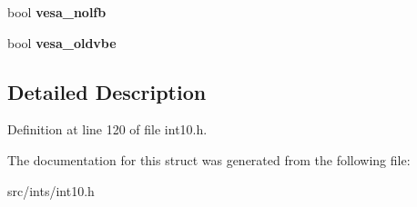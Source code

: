 \begin{DoxyCompactItemize}
\item 
\hypertarget{structInt10Data_a25015b165dce6ad2ac4ec7ba6507f3f2}{bool {\bfseries vesa\-\_\-nolfb}}\label{structInt10Data_a25015b165dce6ad2ac4ec7ba6507f3f2}

\item 
\hypertarget{structInt10Data_a42477f5021cd4868b95435077f26e641}{bool {\bfseries vesa\-\_\-oldvbe}}\label{structInt10Data_a42477f5021cd4868b95435077f26e641}

\end{DoxyCompactItemize}


\subsection{Detailed Description}


Definition at line 120 of file int10.\-h.



The documentation for this struct was generated from the following file\-:\begin{DoxyCompactItemize}
\item 
src/ints/int10.\-h\end{DoxyCompactItemize}
